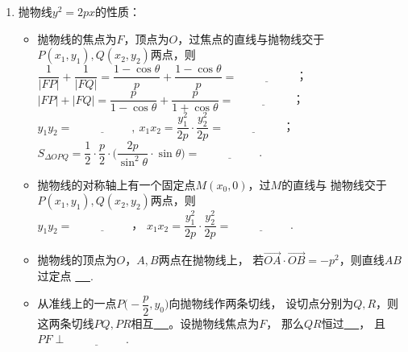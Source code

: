 \documentclass{article}
\newif\ifte
\renewcommand{\vec}{\overrightarrow}
\begin{document}
\begin{multicols}{2}
\begin{enumerate}[leftmargin=20pt]
\begin{itemize}[leftmargin=-4pt]
\end{itemize}

\item 抛物线$ y^2=2px $的性质：
\begin{itemize}[leftmargin=-4pt]
    
\item 抛物线的焦点为$ F $，顶点为$ O $，过焦点的直线与抛物线交于$ P(x_1,y_1),
Q(x_2,y_2) $两点，则 \\ $ \dfrac{1}{|FP|}+\dfrac{1}{|FQ|}=
\dfrac{1-\cos\theta}{p}+\dfrac{1-\cos\theta}{p}=
\underline{\ \ifte \dfrac{2}{p}\else \hspace{2cm} \fi\ } $；\\
$ |FP|+|FQ|=\dfrac{p}{1-\cos\theta}+\dfrac{p}{1+\cos\theta}
=\underline{\ \ifte \dfrac{2p}{\sin^2\theta}\else \hspace{2cm} \fi\ } $；\\
$ y_1y_2=\underline{\ \ifte -p^2 \else \hspace{2cm} \fi\ },\ 
x_1x_2=\dfrac{y_1^2}{2p}\cdot \dfrac{y_2^2}{2p}=
\underline{\ \ifte \dfrac{p^2}{4}\else \hspace{2cm} \fi\ } $；\\
$ S_{\Delta OPQ}=\dfrac{1}{2}\cdot \dfrac{p}{2}\cdot\Big(\dfrac{2p}{\sin^2\theta}\cdot \sin\theta\Big)=
\underline{\ \ifte \dfrac{p^2}{2\sin\theta}\else \hspace{2cm} \fi\ } $.

\item 抛物线的对称轴上有一个固定点$ M(x_0,0) $，过$ M $的直线与
抛物线交于$ P(x_1,y_1),Q(x_2,y_2) $两点，则\\ $ y_1y_2=
\underline{\ \ifte -2px_0\else \hspace{2cm} \fi\ } $，
$ x_1x_2=\dfrac{y_1^2}{2p}\cdot \dfrac{y_2^2}{2p}=
\underline{\ \ifte x_0^2\else \hspace{2cm} \fi\ } $.

\item 抛物线的顶点为$ O $，$ A,B $两点在抛物线上，
若$ \vec{OA}\cdot\vec{OB}=-p^2 $，则直线$ AB $过定点
\underline{\ \ifte $ (p,0) $\else \hspace{2cm} \fi\ }.

\item 从准线上的一点$ P\Big(-\dfrac{p}{2},y_0\Big) $向抛物线作两条切线，
设切点分别为$ Q,R $，则这两条切线$ PQ,PR $相互\underline{\ 
    \ifte 垂直\else \hspace{2cm} \fi\ }。设抛物线焦点为$ F $，
那么$ QR $恒过\underline{\ \ifte 焦点 \else \hspace{2cm} \fi\ }，
且$ PF\perp \underline{\ \ifte QR\else \hspace{2cm} \fi\ } $.


\end{itemize}
\end{enumerate}
\end{multicols}
\end{document}
